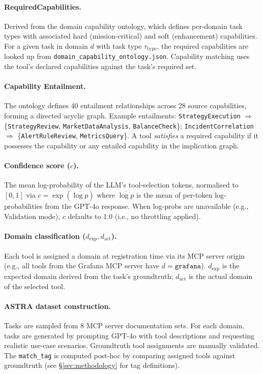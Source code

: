 \documentclass[10pt,a4paper,twocolumn]{article}
\begin{document}
\paragraph{RequiredCapabilities.} Derived from the domain capability ontology, which defines per-domain task types with associated hard (mission-critical) and soft (enhancement) capabilities. For a given task in domain $d$ with task type $\tau_{\text{type}}$, the required capabilities are looked up from \texttt{domain\_capability\_ontology.json}. Capability matching uses the tool's declared capabilities against the task's required set.

\paragraph{Capability Entailment.} The ontology defines 40 entailment relationships across 28 source capabilities, forming a directed acyclic graph. Example entailments: \texttt{StrategyExecution} $\Rightarrow$ \{\texttt{StrategyReview}, \texttt{MarketDataAnalysis}, \texttt{BalanceCheck}\}; \texttt{IncidentCorrelation} $\Rightarrow$ \{\texttt{AlertRuleReview}, \texttt{MetricsQuery}\}. A tool \emph{satisfies} a required capability if it possesses the capability or any entailed capability in the implication graph.

\paragraph{Confidence score ($c$).} The mean log-probability of the LLM's tool-selection tokens, normalised to $[0,1]$ via $c = \exp(\overline{\log p})$ where $\overline{\log p}$ is the mean of per-token log-probabilities from the GPT-4o response. When log-probs are unavailable (e.g., Validation mode), $c$ defaults to 1.0 (i.e., no throttling applied).

\paragraph{Domain classification ($d_{\text{exp}}, d_{\text{act}}$).} Each tool is assigned a domain at registration time via its MCP server origin (e.g., all tools from the Grafana MCP server have $d = \texttt{grafana}$). $d_{\text{exp}}$ is the expected domain derived from the task's groundtruth; $d_{\text{act}}$ is the actual domain of the selected tool.

\paragraph{ASTRA dataset construction.} Tasks are sampled from 8 MCP server documentation sets. For each domain, tasks are generated by prompting GPT-4o with tool descriptions and requesting realistic use-case scenarios. Groundtruth tool assignments are manually validated. The \texttt{match\_tag} is computed post-hoc by comparing assigned tools against groundtruth (see \S\ref{sec:methodology} for tag definitions).
\end{document}
